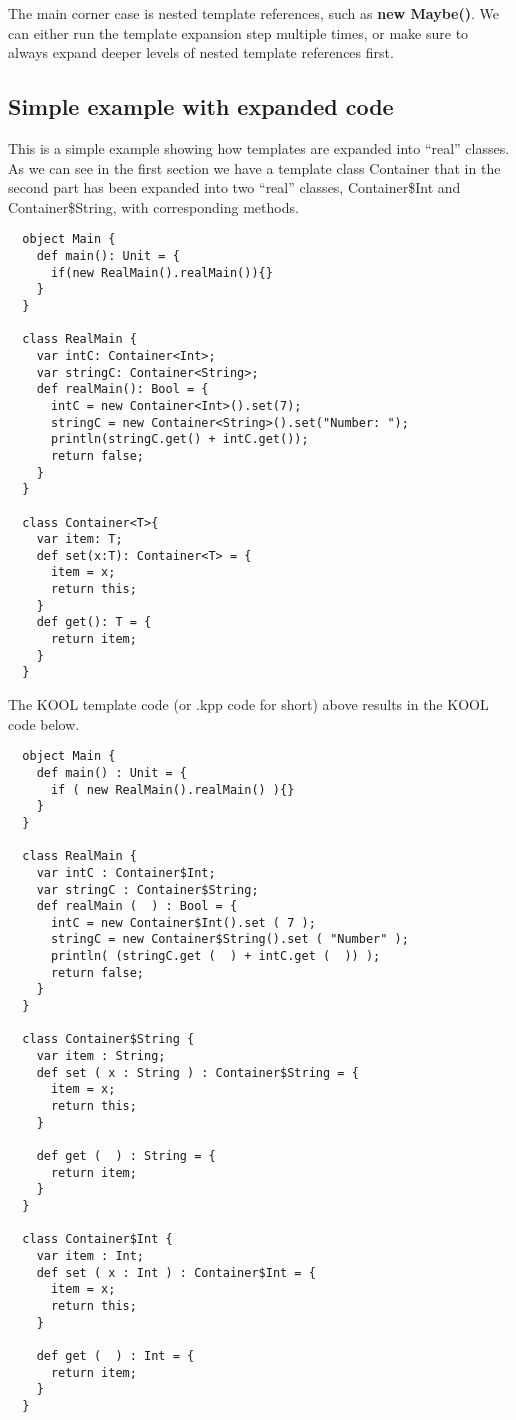 The main corner case is nested template references, such as \textbf{new
Maybe()}.
We can either run the template expansion step multiple times, or make sure to
always expand deeper levels of nested template references first.


\subsection{Simple example with expanded code}

This is a simple example showing how templates are expanded into ``real''
classes. As we can see in the first section we have a template class
Container that in the second part has been expanded into two ``real''
classes, Container\$Int and Container\$String, with corresponding methods.

\begin{lstlisting}
  object Main {
    def main(): Unit = {
      if(new RealMain().realMain()){}
    }
  }

  class RealMain {
    var intC: Container<Int>;
    var stringC: Container<String>;
    def realMain(): Bool = {
      intC = new Container<Int>().set(7);
      stringC = new Container<String>().set("Number: ");
      println(stringC.get() + intC.get());
      return false;
    }
  }

  class Container<T>{
    var item: T;
    def set(x:T): Container<T> = {
      item = x;
      return this;
    }
    def get(): T = {
      return item;
    }
  }

\end{lstlisting}

The KOOL template code (or .kpp code for short) above results in the
KOOL code below.

\begin{lstlisting}
  object Main {
    def main() : Unit = {
      if ( new RealMain().realMain() ){}
    }
  }

  class RealMain {
    var intC : Container$Int;
    var stringC : Container$String;
    def realMain (  ) : Bool = {
      intC = new Container$Int().set ( 7 );
      stringC = new Container$String().set ( "Number" );
      println( (stringC.get (  ) + intC.get (  )) );
      return false;
    }
  }

  class Container$String {
    var item : String;
    def set ( x : String ) : Container$String = {
      item = x;
      return this;
    }

    def get (  ) : String = {
      return item;
    }
  }

  class Container$Int {
    var item : Int;
    def set ( x : Int ) : Container$Int = {
      item = x;
      return this;
    }

    def get (  ) : Int = {
      return item;
    }
  }

\end{lstlisting}
